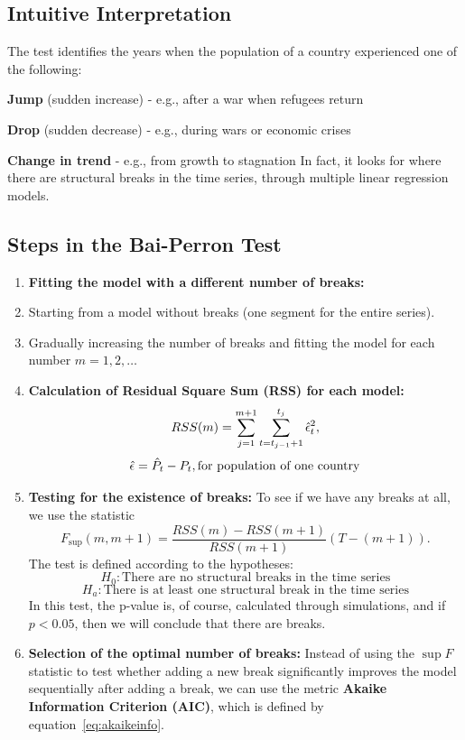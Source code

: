 \documentclass[a4paper,11pt]{article}
\begin{document}
\subsection{Intuitive Interpretation}
The test identifies the years when the population of a country experienced one of the following:
\item \textbf{Jump} (sudden increase) - e.g., after a war when refugees return
\item \textbf{Drop} (sudden decrease) - e.g., during wars or economic crises
\item \textbf{Change in trend} - e.g., from growth to stagnation
In fact, it looks for where there are structural breaks in the time series, through multiple linear regression models.
\subsection{Steps in the Bai-Perron Test}
\begin{enumerate}
    \item \textbf{Fitting the model with a different number of breaks:}
    \item Starting from a model without breaks (one segment for the entire series).
        \item Gradually increasing the number of breaks and fitting the model for each number \( m = 1, 2, \dots \)
    \item \textbf{Calculation of Residual Square Sum (RSS) for each model:}
    $$
    RSS(m) = \sum_{j=1}^{m+1} \sum_{t = t_{j-1} + 1}^{t_j} \hat\epsilon_t^2\space,
    $$
    $$\hat\epsilon = \hat P_t - P_t\space, \text{for population of one country} $$
    \item \textbf{Testing for the existence of breaks:}
    To see if we have any breaks at all, we use the statistic
    $$
    F_{\text{sup}}(m, m+1) = \frac{RSS(m) - RSS(m+1)}{RSS(m+1)} \left(T - (m+1)\right).
    $$
    The test is defined according to the hypotheses:
    $$
    H_0: \text{There are no structural breaks in the time series}
    $$
    $$
    H_a: \text{There is at least one structural break in the time series}
    $$
    In this test, the p-value is, of course, calculated through simulations, and if $p < 0.05$, then we will conclude that there are breaks.
    \item \textbf{Selection of the optimal number of breaks:}
    Instead of using the $\sup F$ statistic to test whether adding a new break significantly improves the model sequentially after adding a break, we can use the metric \textbf{Akaike Information Criterion (AIC)}, which is defined by equation~\eqref{eq:akaikeinfo}.
\end{enumerate}
\end{document}
